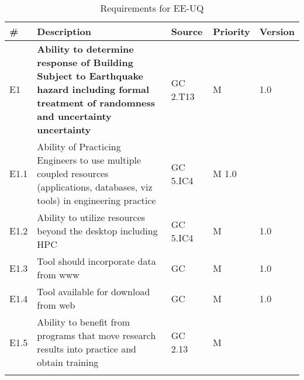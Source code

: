 \begin{longtable}{| p{} | p{} | p{} | p{} |  p{} |}

  \caption{Requirements for EE-UQ}
  \label{tab:featureRequirements}    
     \\
   \hline
\rowcolor{lightgray}

      \# & Description & Source & Priority & Version \\ \hline
      E1 & \textbf{Ability to determine response of Building Subject to Earthquake hazard including formal treatment of randomness and uncertainty uncertainty} & GC 2.T13 & M  & 1.0  \\ \hline
 E1.1 & Ability of Practicing Engineers to use multiple coupled resources (applications, databases, viz tools) in engineering practice & GC 5.IC4 & M 1.0 & \\ \hline
E1.2 & Ability to utilize resources beyond the desktop including HPC & GC 5.IC4 & M & 1.0 \\ \hline
E1.3 & Tool should incorporate data from www & GC & M & 1.0 \\ \hline
E1.4 & Tool available for download from web & GC & M & 1.0 \\ \hline
E1.5 & Ability to benefit from programs that move research results into practice and obtain training & GC 2.13 & M & \\ \hhline{=====}


\end{longtable}
